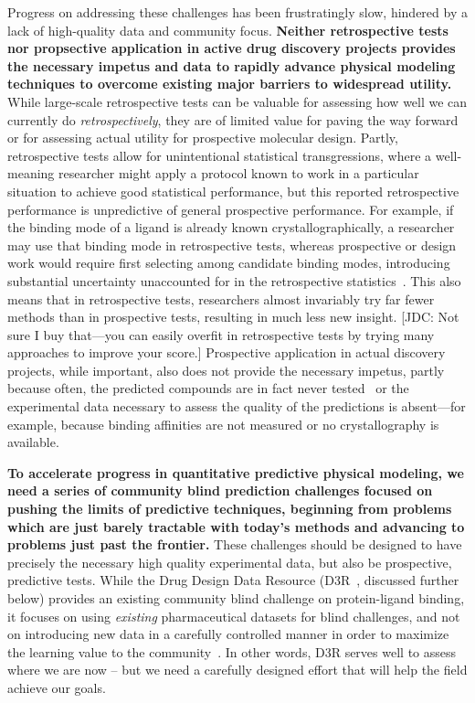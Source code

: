 \documentclass[11pt]{article}
\begin{document}
Progress on addressing these challenges has been frustratingly slow, hindered by a lack of high-quality data and community focus.
{\bf Neither retrospective tests nor propsective application in active drug discovery projects provides the necessary impetus and data to rapidly advance physical modeling techniques to overcome existing major barriers to widespread utility.}
While large-scale retrospective tests can be valuable for assessing how well we can currently do \emph{retrospectively}, they are of limited value for paving the way forward or for assessing actual utility for prospective molecular design.
Partly, retrospective tests allow for unintentional statistical transgressions, where a well-meaning researcher might apply a protocol known to work in a particular situation to achieve good statistical performance, but this reported retrospective performance is unpredictive of general prospective performance.
For example, if the binding mode of a ligand is already known crystallographically, a researcher may use that binding mode in retrospective tests, whereas prospective or design work would require first selecting among candidate binding modes, introducing substantial uncertainty unaccounted for in the retrospective statistics~\cite{mobley_predicting_2007, boyce_predicting_2009, mobley_perspective_2012}.
This also means that in retrospective tests, researchers almost invariably try far fewer methods than in prospective tests, resulting in much less new insight.
{\color{red}[JDC: Not sure I buy that---you can easily overfit in retrospective tests by trying many approaches to improve your score.]}
Prospective application in actual discovery projects, while important, also does not provide the necessary impetus, partly because often, the predicted compounds are in fact never tested~\cite{christ_binding_2016} or the experimental data necessary to assess the quality of the predictions is absent---for example, because binding affinities are not measured or no crystallography is available. 

{\bf To accelerate progress in quantitative predictive physical modeling, we need a series of community blind prediction challenges focused on pushing the limits of predictive techniques, beginning from problems which are just barely tractable with today's methods and advancing to problems just past the frontier.}
These challenges should be designed to have precisely the necessary high quality experimental data, but also be prospective, predictive tests.
While the Drug Design Data Resource (D3R~\cite{gathiaka_d3r_2016}, discussed further below) provides an existing community blind challenge on protein-ligand binding, it focuses on using \emph{existing} pharmaceutical datasets for blind challenges, and not on introducing new data in a carefully controlled manner in order to maximize the learning value to the community~\cite{gathiaka_d3r_2016}. 
In other words, D3R serves well to assess where we are now -- but we need a carefully designed effort that will help the field achieve our goals.
\end{document}
